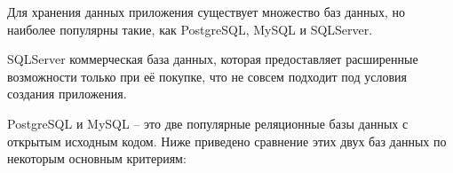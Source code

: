 Для хранения данных приложения существует множество баз данных,
но наиболее популярны такие, как PostgreSQL, MySQL и SQLServer.

SQLServer коммерческая база данных, которая предоставляет
расширенные возможности только при её покупке, что не совсем подходит под
условия создания приложения.

PostgreSQL и MySQL – это две популярные реляционные базы данных с
открытым исходным кодом. Ниже приведено сравнение этих двух баз данных
по некоторым основным критериям:





